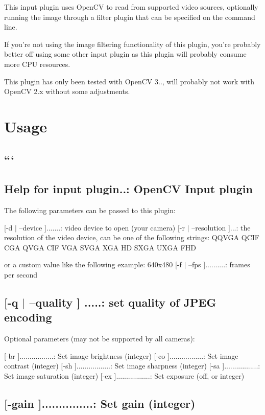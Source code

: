 This input plugin uses Open\+C\+V to read from supported video sources, optionally running the image through a filter plugin that can be specified on the command line.

If you're not using the image filtering functionality of this plugin, you're probably better off using some other input plugin as this plugin will probably consume more C\+P\+U resources.

This plugin has only been tested with Open\+C\+V 3.., will probably not work with Open\+C\+V 2.\+x without some adjustments.

\section*{Usage }

\subsection*{``` }

\subsection*{Help for input plugin..\+: Open\+C\+V Input plugin }

The following parameters can be passed to this plugin\+:

\mbox{[}-\/d $\vert$ --device \mbox{]}.......\+: video device to open (your camera) \mbox{[}-\/r $\vert$ --resolution \mbox{]}...\+: the resolution of the video device, can be one of the following strings\+: Q\+Q\+V\+G\+A Q\+C\+I\+F C\+G\+A Q\+V\+G\+A C\+I\+F V\+G\+A S\+V\+G\+A X\+G\+A H\+D S\+X\+G\+A U\+X\+G\+A F\+H\+D

or a custom value like the following example\+: 640x480 \mbox{[}-\/f $\vert$ --fps \mbox{]}..........\+: frames per second \subsection*{\mbox{[}-\/q $\vert$ --quality \mbox{]} .....\+: set quality of J\+P\+E\+G encoding }

Optional parameters (may not be supported by all cameras)\+:

\mbox{[}-\/br \mbox{]}.................\+: Set image brightness (integer) \mbox{[}-\/co \mbox{]}.................\+: Set image contrast (integer) \mbox{[}-\/sh \mbox{]}.................\+: Set image sharpness (integer) \mbox{[}-\/sa \mbox{]}.................\+: Set image saturation (integer) \mbox{[}-\/ex \mbox{]}.................\+: Set exposure (off, or integer) \subsection*{\mbox{[}-\/gain \mbox{]}...............\+: Set gain (integer) }

